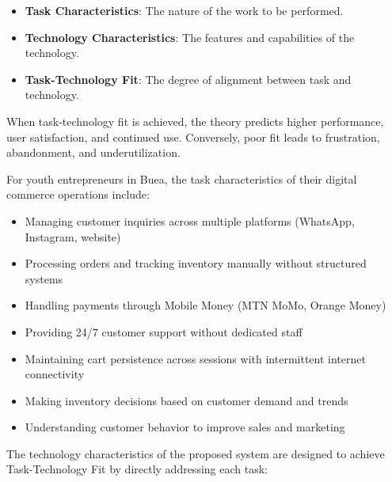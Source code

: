 \documentclass[12pt,a4paper]{article}
\begin{document}
\begin{itemize}
    \item \textbf{Task Characteristics}: The nature of the work to be performed.
    \item \textbf{Technology Characteristics}: The features and capabilities of the technology.
    \item \textbf{Task-Technology Fit}: The degree of alignment between task and technology.
\end{itemize}

When task-technology fit is achieved, the theory predicts higher performance, user satisfaction, and continued use. Conversely, poor fit leads to frustration, abandonment, and underutilization.

For youth entrepreneurs in Buea, the task characteristics of their digital commerce operations include:

\begin{itemize}
    \item Managing customer inquiries across multiple platforms (WhatsApp, Instagram, website)
    \item Processing orders and tracking inventory manually without structured systems
    \item Handling payments through Mobile Money (MTN MoMo, Orange Money)
    \item Providing 24/7 customer support without dedicated staff
    \item Maintaining cart persistence across sessions with intermittent internet connectivity
    \item Making inventory decisions based on customer demand and trends
    \item Understanding customer behavior to improve sales and marketing
\end{itemize}

The technology characteristics of the proposed system are designed to achieve Task-Technology Fit by directly addressing each task:
\end{document}
